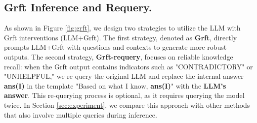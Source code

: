 \subsection{Grft Inference and Requery.}
\label{Sec:Inference}
As shown in Figure \ref{fig:grft}, we design two strategies to utilize the LLM with Grft interventions (LLM+Grft). The first strategy, denoted as \textbf{Grft}, directly prompts LLM+Grft with questions and contexts to generate more robust outputs. The second strategy, \textbf{Grft-requery}, focuses on reliable knowledge recall: when the Grft output contains indicators such as "CONTRADICTORY" or "UNHELPFUL," we re-query the original LLM and replace the internal answer \textbf{{ans(I)}} in the template "Based on what I know, \textbf{{ans(I)}}" with the \textbf{LLM's  answer}. This re-querying process is optional, as it requires querying the model twice. In  Section \ref{sec:experiment}, we compare this approach with other methods that also involve multiple queries during inference. 

